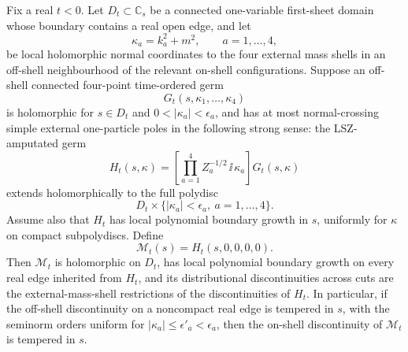 \begin{theorem}
\label{thm:lsz-transfer-fixed-t-domain}
Fix a real \(t<0\).  Let \(D_t\subset\mathbb C_s\) be a connected
one-variable first-sheet domain whose boundary contains a real open edge, and
let
\[
  \kappa_a=k_a^2+m^2,\qquad a=1,\ldots,4,
\]
be local holomorphic normal coordinates to the four external mass shells in an
off-shell neighbourhood of the relevant on-shell configurations.  Suppose an
off-shell connected four-point time-ordered germ
\[
  G_t(s,\kappa_1,\ldots,\kappa_4)
\]
is holomorphic for \(s\in D_t\) and \(0<|\kappa_a|<\epsilon_a\), and has at
most normal-crossing simple external one-particle poles in the following
strong sense: the LSZ-amputated germ
\begin{equation}
  H_t(s,\kappa)
  =
  \left[
    \prod_{a=1}^4
    Z_a^{-1/2}\,\ii\,\kappa_a
  \right]
  G_t(s,\kappa)
  \label{eq:fixed-t-offshell-lsz-amputated-germ}
\end{equation}
extends holomorphically to the full polydisc
\[
  D_t\times\{|\kappa_a|<\epsilon_a,\ a=1,\ldots,4\}.
\]
Assume also that \(H_t\) has local polynomial boundary growth in \(s\),
uniformly for \(\kappa\) on compact subpolydiscs.  Define
\begin{equation}
  \mathcal M_t(s)=H_t(s,0,0,0,0).
  \label{eq:fixed-t-lsz-transferred-amplitude}
\end{equation}
Then \(\mathcal M_t\) is holomorphic on \(D_t\), has local polynomial
boundary growth on every real edge inherited from \(H_t\), and its
distributional discontinuities across cuts are the external-mass-shell
restrictions of the discontinuities of \(H_t\).  In particular, if the
off-shell discontinuity on a noncompact real edge is tempered in \(s\), with
the seminorm orders uniform for \(|\kappa_a|\le\epsilon'_a<\epsilon_a\), then
the on-shell discontinuity of \(\mathcal M_t\) is tempered in \(s\).
\end{theorem}

